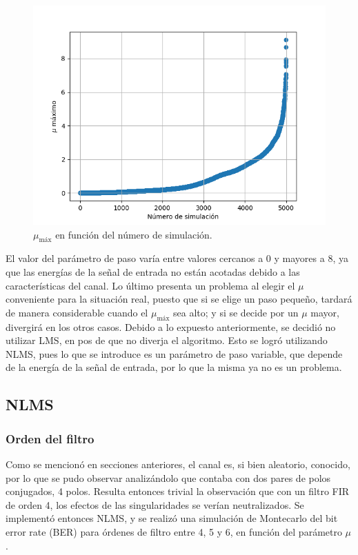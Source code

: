 \documentclass[main.tex]{subfiles}
\begin{document}
\begin{figure}[H]
    \centering
    \includegraphics[scale=0.5]{imagenes/lms_mus_scatter.png}
    \caption{$\mu_\text{máx}$ en función del número de simulación.}
\end{figure}

El valor del parámetro de paso varía entre valores cercanos a 0 y mayores a 8, 
ya que las energías de la señal de entrada no están acotadas debido a las características 
del canal. Lo último presenta un problema al elegir el $\mu$ conveniente para la situación real,
puesto que si se elige un paso pequeño, tardará de manera considerable cuando el $\mu_\text{máx}$ sea alto;
y si se decide por un $\mu$ mayor, divergirá en los otros casos. \newline
Debido a lo expuesto anteriormente, se decidió no utilizar LMS, en pos de que no diverja el algoritmo. 
Esto se logró utilizando NLMS, pues lo que se introduce es un parámetro de paso variable, que depende
de la energía de la señal de entrada, por lo que la misma ya no es un problema.

\subsection*{NLMS}
\subsubsection*{Orden del filtro}
Como se mencionó en secciones anteriores, el canal es, si bien aleatorio, conocido, por 
lo que se pudo observar analizándolo que contaba con dos pares de polos conjugados, 4 polos.
Resulta entonces trivial la observación que con un filtro FIR de orden 4, los efectos 
de las singularidades se verían neutralizados. Se implementó entonces NLMS, y se realizó
una simulación de Montecarlo del bit error rate (BER) para órdenes de filtro entre 4, 5 y 6, en función del parámetro 
$\mu$.
\end{document}
